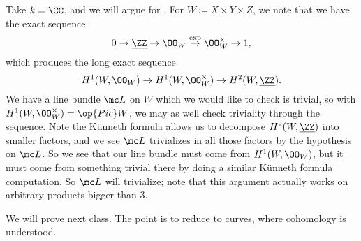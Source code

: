 \documentclass[../notes.tex]{subfiles}
\begin{document}
\begin{remark}
	Take $k=\CC$, and we will argue for . For $W\coloneqq X\times Y\times Z$, we note that we have the exact sequence
	\[0\to\underline{\ZZ}\to\OO_W\stackrel{\exp}\to\OO_W^\times\to1,\]
	which produces the long exact sequence
	\[H^1(W,\OO_W)\to H^1(W,\OO_W^\times)\to H^2(W,\underline{\ZZ}).\]
	We have a line bundle $\mc L$ on $W$ which we would like to check is trivial, so with $H^1(W,\OO_W^\times)=\op{Pic}W$, we may as well check triviality through the sequence. Note the K\"unneth formula allows us to decompose $H^2(W,\underline{\ZZ})$ into smaller factors, and we see $\mc L$ trivializes in all those factors by the hypothesis on $\mc L$. So we see that our line bundle must come from $H^1(W,\OO_W)$, but it must come from something trivial there by doing a similar K\"unneth formula computation. So $\mc L$ will trivialize; note that this argument actually works on arbitrary products bigger than $3$.
\end{remark}
We will prove  next class. The point is to reduce to curves, where cohomology is understood.
\end{document}
